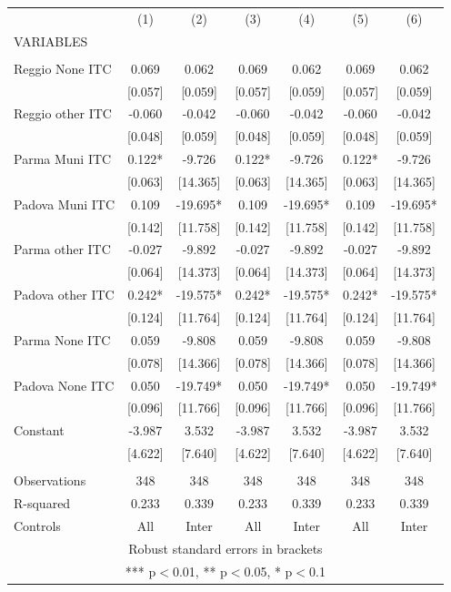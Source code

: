 \begin{tabular}{lcccccc} \hline
 & (1) & (2) & (3) & (4) & (5) & (6) \\
VARIABLES &  &  &  &  &  &  \\ \hline
 &  &  &  &  &  &  \\
Reggio None ITC & 0.069 & 0.062 & 0.069 & 0.062 & 0.069 & 0.062 \\
 & [0.057] & [0.059] & [0.057] & [0.059] & [0.057] & [0.059] \\
Reggio other ITC & -0.060 & -0.042 & -0.060 & -0.042 & -0.060 & -0.042 \\
 & [0.048] & [0.059] & [0.048] & [0.059] & [0.048] & [0.059] \\
Parma Muni ITC & 0.122* & -9.726 & 0.122* & -9.726 & 0.122* & -9.726 \\
 & [0.063] & [14.365] & [0.063] & [14.365] & [0.063] & [14.365] \\
Padova Muni ITC & 0.109 & -19.695* & 0.109 & -19.695* & 0.109 & -19.695* \\
 & [0.142] & [11.758] & [0.142] & [11.758] & [0.142] & [11.758] \\
Parma other ITC & -0.027 & -9.892 & -0.027 & -9.892 & -0.027 & -9.892 \\
 & [0.064] & [14.373] & [0.064] & [14.373] & [0.064] & [14.373] \\
Padova other ITC & 0.242* & -19.575* & 0.242* & -19.575* & 0.242* & -19.575* \\
 & [0.124] & [11.764] & [0.124] & [11.764] & [0.124] & [11.764] \\
Parma None ITC & 0.059 & -9.808 & 0.059 & -9.808 & 0.059 & -9.808 \\
 & [0.078] & [14.366] & [0.078] & [14.366] & [0.078] & [14.366] \\
Padova None ITC & 0.050 & -19.749* & 0.050 & -19.749* & 0.050 & -19.749* \\
 & [0.096] & [11.766] & [0.096] & [11.766] & [0.096] & [11.766] \\
Constant & -3.987 & 3.532 & -3.987 & 3.532 & -3.987 & 3.532 \\
 & [4.622] & [7.640] & [4.622] & [7.640] & [4.622] & [7.640] \\
 &  &  &  &  &  &  \\
Observations & 348 & 348 & 348 & 348 & 348 & 348 \\
R-squared & 0.233 & 0.339 & 0.233 & 0.339 & 0.233 & 0.339 \\
 Controls & All & Inter & All & Inter & All & Inter \\ \hline
\multicolumn{7}{c}{ Robust standard errors in brackets} \\
\multicolumn{7}{c}{ *** p$<$0.01, ** p$<$0.05, * p$<$0.1} \\
\end{tabular}

